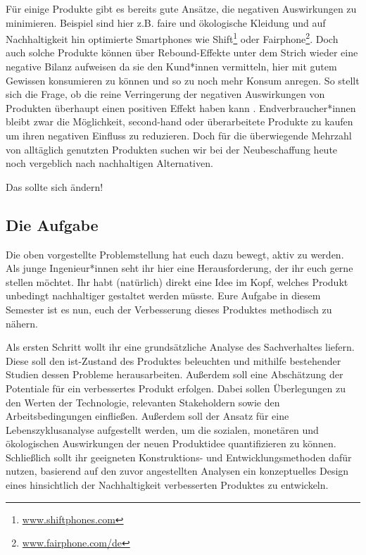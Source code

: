 \documentclass[headinclude=true]{scrartcl}
\begin{document}
Für einige Produkte gibt es bereits gute Ansätze, die negativen Auswirkungen zu minimieren. Beispiel sind hier z.B. faire und ökologische Kleidung und auf Nachhaltigkeit hin optimierte Smartphones wie Shift\footnote{\url{www.shiftphones.com}} oder Fairphone\footnote{\url{www.fairphone.com/de}}. Doch auch solche Produkte können über Rebound-Effekte unter dem Strich wieder eine negative Bilanz aufweisen da sie den Kund*innen vermitteln, hier mit gutem Gewissen konsumieren zu können und so zu noch mehr Konsum anregen.
So stellt sich die Frage, ob die reine Verringerung der negativen Auswirkungen von Produkten überhaupt einen positiven Effekt haben kann \cite{Carstens.2018, Braungart.2013}.
Endverbraucher*innen bleibt zwar die Möglichkeit, second-hand oder überarbeitete Produkte zu kaufen um ihren negativen Einfluss zu reduzieren. Doch für die überwiegende Mehrzahl von alltäglich genutzten Produkten suchen wir bei der Neubeschaffung heute noch vergeblich nach nachhaltigen Alternativen.

Das sollte sich ändern!

\subsection{Die Aufgabe}

Die oben vorgestellte Problemstellung hat euch dazu bewegt, aktiv zu werden. Als junge Ingenieur*innen seht ihr hier eine Herausforderung, der ihr euch gerne stellen möchtet. 
Ihr habt (natürlich) direkt eine Idee im Kopf, welches Produkt unbedingt nachhaltiger gestaltet werden müsste. Eure Aufgabe in diesem Semester ist es nun, euch der Verbesserung dieses Produktes methodisch zu nähern. 

Als ersten Schritt wollt ihr eine grundsätzliche Analyse des Sachverhaltes liefern. Diese soll den ist-Zustand des Produktes beleuchten und mithilfe bestehender Studien dessen Probleme herausarbeiten. 
Außerdem soll eine Abschätzung der Potentiale für ein verbessertes Produkt erfolgen. Dabei sollen Überlegungen zu den Werten der Technologie, relevanten Stakeholdern sowie den Arbeitsbedingungen einfließen. Außerdem soll der Ansatz für eine Lebenszyklusanalyse aufgestellt werden, um die sozialen, monetären und ökologischen Auswirkungen der neuen Produktidee quantifizieren zu können. 
Schließlich sollt ihr geeigneten Konstruktions- und Entwicklungsmethoden dafür nutzen, basierend auf den zuvor angestellten Analysen ein konzeptuelles Design eines hinsichtlich der Nachhaltigkeit verbesserten Produktes zu entwickeln. 
\end{document}
